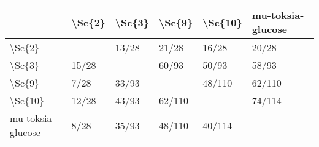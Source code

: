 \begin{tabular}{llllll}
\toprule
{} & \textbackslash Sc\{2\} & \textbackslash Sc\{3\} &  \textbackslash Sc\{9\} & \textbackslash Sc\{10\} & mu-toksia-glucose \\
\midrule
\textbackslash Sc\{2\}            &        &  13/28 &   21/28 &   16/28 &             20/28 \\
\textbackslash Sc\{3\}            &  15/28 &        &   60/93 &   50/93 &             58/93 \\
\textbackslash Sc\{9\}            &   7/28 &  33/93 &         &  48/110 &            62/110 \\
\textbackslash Sc\{10\}           &  12/28 &  43/93 &  62/110 &         &            74/114 \\
mu-toksia-glucose &   8/28 &  35/93 &  48/110 &  40/114 &                   \\
\bottomrule
\end{tabular}
